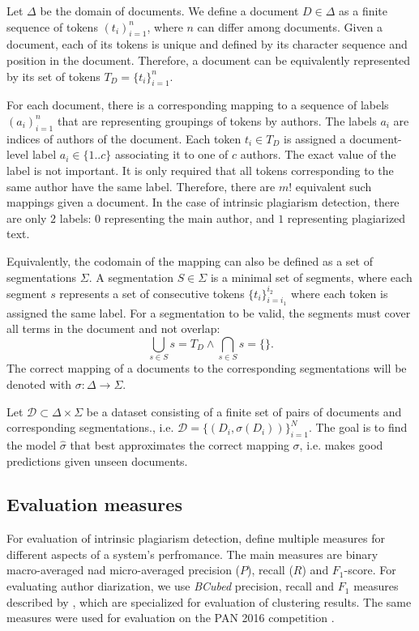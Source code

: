 \documentclass[10pt, a4paper]{article}
\begin{document}
Let $\Delta$ be the domain of documents. We define a document $D\in \Delta$ as a finite sequence of tokens $(t_i)_{i=1}^n$, where $n$ can differ among documents. Given a document, each of its tokens is unique and defined by its character sequence and position in the document. Therefore, a document can be equivalently represented by its set of tokens $T_D=\{t_i\}_{i=1}^n$.

For each document, there is a corresponding mapping to a sequence of labels $(a_i)_{i=1}^n$ that are representing groupings of tokens by authors. The labels $a_i$ are indices of authors of the document. Each token $t_i\in T_D$ is assigned a document-level label $a_i \in \{1..c\}$ associating it to one of $c$ authors. The exact value of the label is not important. It is only required that all tokens corresponding to the same author have the same label. Therefore, there are $m!$ equivalent such mappings given a document. In the case of intrinsic plagiarism detection, there are only $2$ labels: $0$ representing the main author, and $1$ representing plagiarized text.

Equivalently, the codomain of the mapping can also be defined as a set of segmentations $\Sigma$. A segmentation $S\in \Sigma$ is a minimal set of segments, where each segment $s$ represents a set of consecutive tokens $\{t_i\}_{i=i_1}^{i_2}$ where each token is assigned the same label. For a segmentation to be valid, the segments must cover all terms in the document and not overlap:
\begin{equation}
	\bigcup_{s\in S}s = T_D  \wedge \bigcap_{s\in S}s = \{\}.
\end{equation}
The correct mapping of a documents to the corresponding segmentations will be denoted with $\sigma: \Delta\rightarrow\Sigma$.

Let $\mathcal{D} \subset \Delta\times\Sigma$ be a dataset consisting of a finite set of pairs of documents and corresponding segmentations., i.e. $\mathcal{D} = \{\left(D_i, \sigma(D_i)\right)\}_{i=1}^N$. The goal is to find the model $\hat{\sigma}$ that best approximates the correct mapping $\sigma$, i.e. makes good predictions given unseen documents.

\subsection{Evaluation measures}

For evaluation of intrinsic plagiarism detection, \citet{stein-2010} define multiple measures for different aspects of a system's perfromance. The main measures are binary macro-averaged nad micro-averaged precision ($P$), recall ($R$) and $F_1$-score. For evaluating author diarization, we use \emph{BCubed} precision, recall and $F_1$ measures described by \citet{amigo-2009}, which are specialized for evaluation of clustering results. The same measures were used for evaluation on the PAN 2016 competition \citep{rosso-2016}.
\end{document}
